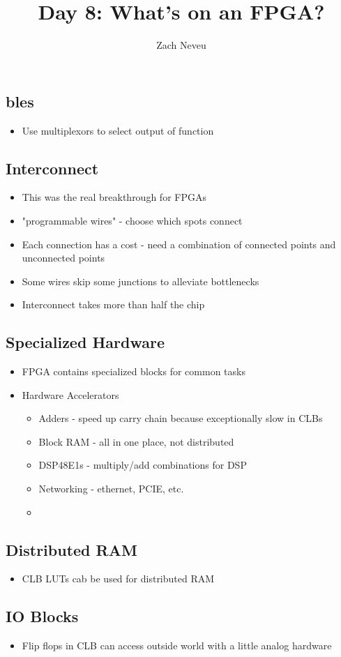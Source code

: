 \documentclass[12pt, letter]{article}
\author{Zach Neveu}
\title{ Day 8: What's on an FPGA? }
\begin{document}
\maketitle
\subsection*{ \acp{ble}}
\begin{itemize}
	\item Use multiplexors to select output of function
\end{itemize}

\subsection*{Interconnect}
\begin{itemize}
	\item This was the real breakthrough for FPGAs
	\item "programmable wires" - choose which spots connect
	\item Each connection has a cost - need a combination of connected points and unconnected points
	\item Some wires skip some junctions to alleviate bottlenecks
	\item Interconnect takes more than half the chip
\end{itemize}

\subsection*{Specialized Hardware}
\begin{itemize}
	\item FPGA contains specialized blocks for common tasks
	\item Hardware Accelerators
	\begin{itemize}
		\item Adders - speed up carry chain because exceptionally slow in CLBs
		\item Block RAM - all in one place, not distributed
		\item DSP48E1s - multiply/add combinations for DSP
		\item Networking - ethernet, PCIE, etc.
		\item 
	\end{itemize}
\end{itemize}

\subsection*{Distributed RAM}
\begin{itemize}
	\item \ac{CLB} \acp{LUT} cab be used for distributed RAM
\end{itemize}

\subsection*{IO Blocks}
\begin{itemize}
	\item Flip flops in \ac{CLB} can access outside world with a little analog hardware
\end{itemize}
\end{document}
